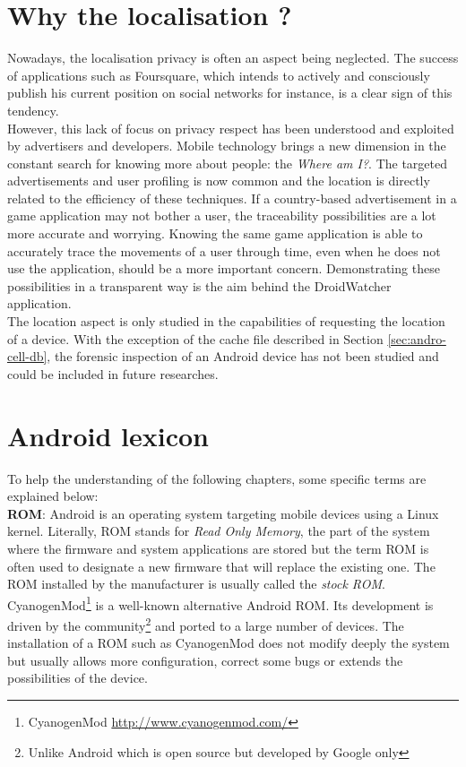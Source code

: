\section*{Why the localisation ?}
\label{sec:why-localisation}

Nowadays, the localisation privacy is often an aspect being neglected.
The success of applications such as Foursquare, which intends to actively and consciously publish his current position on social networks for instance, is a clear sign of this tendency.\\

However, this lack of focus on privacy respect has been understood and exploited by advertisers and developers.
Mobile technology brings a new dimension in the constant search for knowing more about people: the \emph{Where am I?}.
The targeted advertisements and user profiling is now common and the location is directly related to the efficiency of these techniques.
If a country-based advertisement in a game application may not bother a user, the traceability possibilities are a lot more accurate and worrying.
Knowing the same game application is able to accurately trace the movements of a user through time, even when he does not use the application, should be a more important concern.
Demonstrating these possibilities in a transparent way is the aim behind the DroidWatcher application.\\

The location aspect is only studied in the capabilities of requesting the location of a device.
With the exception of the cache file described in Section \ref{sec:andro-cell-db}, the forensic inspection of an Android device has not been studied and could be included in future researches.

\section*{Android lexicon}
\label{sec:android-lexicon}

To help the understanding of the following chapters, some specific terms are explained below:\\

\textbf{ROM}: Android is an operating system targeting mobile devices using a Linux kernel.
Literally, ROM stands for \emph{Read Only Memory}, the part of the system where the firmware and system applications are stored but the term ROM is often used to designate a new firmware that will replace the existing one.
The ROM installed by the manufacturer is usually called the \emph{stock ROM}.
CyanogenMod\footnote{CyanogenMod \url{http://www.cyanogenmod.com/}} is a well-known alternative Android ROM.
Its development is driven by the community\footnote{Unlike Android which is open source but developed by Google only} and ported to a large number of devices.
The installation of a ROM such as CyanogenMod does not modify deeply the system but usually allows more configuration, correct some bugs or extends the possibilities of the device.\\

